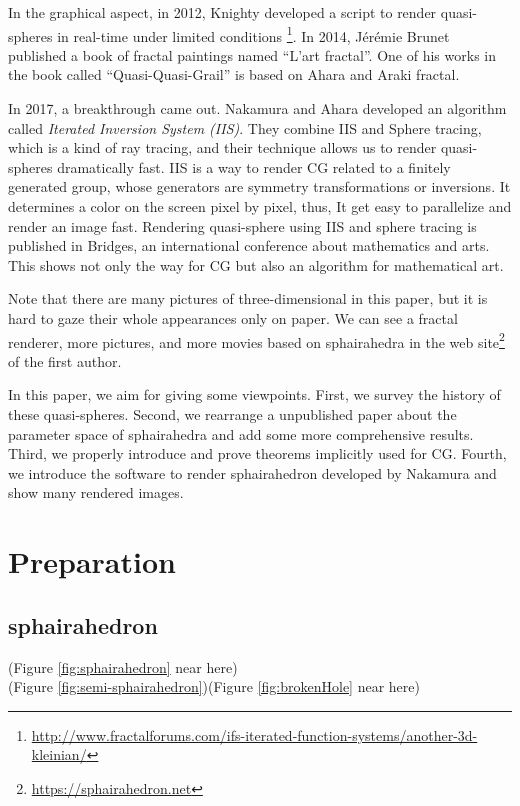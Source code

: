 \documentclass[suppldata, dvipdfmx]{interact}
\theoremstyle{plain}%
\theoremstyle{definition}
\theoremstyle{remark}
\theoremstyle{problemstyle}
\begin{document}
In the graphical aspect, in 2012, Knighty developed a script to render
quasi-spheres in real-time under limited conditions
\footnote{\url{http://www.fractalforums.com/ifs-iterated-function-systems/another-3d-kleinian/}}.
In 2014, J\'er\'emie Brunet published a book of
fractal paintings named ``L'art fractal''. One of his works in the book called
``Quasi-Quasi-Grail'' is based on Ahara and Araki fractal.

In 2017, a breakthrough came out. 
Nakamura and Ahara developed an algorithm called
\textit{Iterated Inversion System (IIS)}\cite{bridges2016}\cite{bridges2017}.
They combine IIS and Sphere tracing, which is a kind of ray tracing, 
and their technique allows us to render quasi-spheres dramatically fast.
IIS is a way to render CG related to a finitely generated group, whose
generators are symmetry transformations or inversions.
It determines a color on the screen pixel by pixel, thus, It get easy to parallelize and render an image fast. 
Rendering quasi-sphere using IIS and sphere tracing is published in
Bridges\cite{bridges2018}, an international conference about mathematics
and arts.
This shows not only the way for CG but also an algorithm for mathematical art.

Note that there are many pictures of three-dimensional in this paper, 
but it is hard to gaze their whole appearances only on paper. We can see a fractal renderer, more pictures, and more movies based on sphairahedra in
the web site\footnote{\url{https://sphairahedron.net}} of the first author.

In this paper, we aim for giving some viewpoints.
First, we survey the history of these quasi-spheres.
Second, we rearrange a unpublished paper about the parameter space of sphairahedra and add some more comprehensive results.
Third, we properly introduce and prove theorems implicitly
used for CG.
Fourth, we introduce the software to render sphairahedron developed by
Nakamura and show many rendered images. 

\section{Preparation}

\subsection{sphairahedron}

\noindent(Figure \ref{fig:sphairahedron}
 near here)\\
\noindent(Figure \ref{fig:semi-sphairahedron})(Figure \ref{fig:brokenHole} near here)
\end{document}
